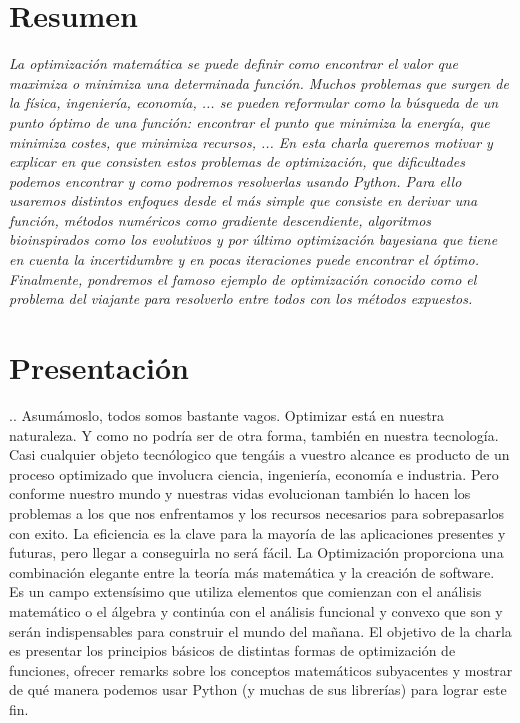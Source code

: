 \documentclass[runningheads]{llncs}
\begin{document}
\section{Resumen}
\textit{La optimización matemática se puede definir como encontrar el valor que maximiza o minimiza una determinada función. Muchos problemas que surgen de la física, ingeniería, economía, ... se pueden reformular como la búsqueda de un punto óptimo de una función: encontrar el punto que minimiza la energía, que minimiza costes, que minimiza recursos, ... 
En esta charla queremos motivar y explicar en que consisten estos problemas de optimización, que dificultades podemos encontrar y como podremos resolverlas usando Python. Para ello usaremos distintos enfoques desde el más simple que consiste en derivar una función, métodos numéricos como gradiente descendiente, algoritmos bioinspirados como los evolutivos y por último optimización bayesiana que tiene en cuenta la incertidumbre y en pocas iteraciones puede encontrar el óptimo.
Finalmente, pondremos el famoso ejemplo de optimización conocido como el problema del viajante para resolverlo entre todos con los métodos expuestos.}

\section{Presentaci\'on}
..
Asumámoslo, todos somos bastante vagos. Optimizar está en nuestra naturaleza. Y como no podría ser de otra forma, también en nuestra tecnología.  Casi cualquier objeto tecnólogico que tengáis a vuestro alcance es producto de un proceso optimizado que involucra ciencia, ingeniería, economía e industria. 
Pero conforme nuestro mundo y nuestras vidas evolucionan también lo hacen los problemas a los que nos enfrentamos y los recursos necesarios para sobrepasarlos con exito. La eficiencia es la clave para la mayoría de las aplicaciones presentes y futuras, pero llegar a conseguirla no será fácil.
La Optimización proporciona una combinación elegante entre la teoría más matemática y la creación de software. Es un campo extensísimo que utiliza elementos que comienzan con el análisis matemático o el álgebra y continúa con el análisis funcional y convexo que son y serán indispensables para construir el mundo del mañana.
El objetivo de la charla es presentar los principios básicos de distintas formas de optimización de funciones, ofrecer remarks sobre los conceptos matemáticos subyacentes y mostrar de qué manera podemos usar Python (y muchas de sus librerías) para lograr este fin.
\end{document}
